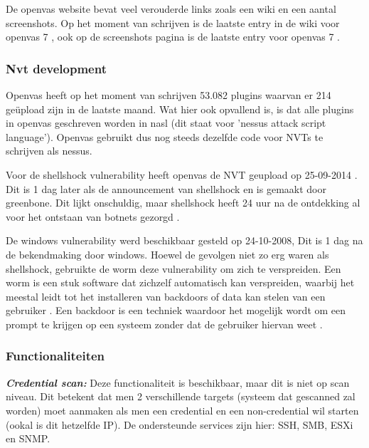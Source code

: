 De openvas website bevat veel verouderde links zoals een wiki en een aantal screenshots. Op het moment van schrijven is de laatste entry in de wiki voor openvas 7 \textcite{Openvas-wiki}, ook op de screenshots pagina is de laatste entry voor openvas 7 \textcite{Openvas-screenshots}.

\subsubsection{Nvt development}

Openvas heeft op het moment van schrijven 53.082 plugins \textcite{Openvas-nvt} waarvan er 214 geüpload zijn in de laatste maand. Wat hier ook opvallend is, is dat alle plugins in openvas geschreven worden in nasl (dit staat voor 'nessus attack script language'). Openvas gebruikt dus nog steeds dezelfde code voor NVTs te schrijven als nessus. 

Voor de shellshock vulnerability heeft openvas de NVT geupload op 25-09-2014 \textcite{Vulners-shellshock-openvas}. Dit is 1 dag later als de announcement van shellshock en is gemaakt door greenbone. Dit lijkt onschuldig, maar shellshock heeft 24 uur na de ontdekking al voor het ontstaan van botnets gezorgd \textcite{wired-shellshock}. 

De windows vulnerability werd beschikbaar gesteld op 24-10-2008, Dit is 1 dag na de bekendmaking door windows. Hoewel de gevolgen niet zo erg waren als shellshock, gebruikte de worm \textcite{Microsoft} deze vulnerability om zich te verspreiden. Een worm is een stuk software dat zichzelf automatisch kan verspreiden, waarbij het meestal leidt tot het installeren van backdoors of data kan stelen van een gebruiker \textcite{pctools-worm}. Een backdoor is een techniek waardoor het mogelijk wordt om een prompt te krijgen op een systeem zonder dat de gebruiker hiervan weet \textcite{techopedia-backdoor}.

\subsubsection{Functionaliteiten}

\textbf{\textit{Credential scan: }} Deze functionaliteit is beschikbaar, maar dit is niet op scan niveau. Dit betekent dat men 2 verschillende targets (systeem dat gescanned zal worden) moet aanmaken als men een credential en een non-credential wil starten (ookal is dit hetzelfde IP). De ondersteunde services zijn hier: SSH, SMB, ESXi en SNMP.

